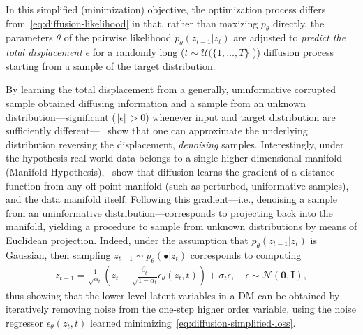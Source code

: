 In this simplified (minimization) objective, the optimization process differs from~\ref{eq:diffusion-likelihood} in that, rather than maxizing \( p_\theta \) directly, the parameters \( \theta \) of the pairwise likelihood \( p_\theta(z_{t-1} \vert z_t) \) are adjusted to \emph{predict the total displacement} \( \epsilon \) for a randomly long (\( t \sim \mathcal{U}(\{1,\dots,T\} \) )) diffusion process starting from a sample of the target distribution.

By learning the total displacement from a generally, uninformative corrupted sample obtained diffusing information and a sample from an unknown distribution---significant (\( \Vert \epsilon \Vert > 0 \)) whenever input and target distribution are sufficiently different---~\citet{hoDenoisingDiffusionProbabilistic2020} show that one can approximate the underlying distribution reversing the displacement, \emph{denoising} samples.
Interestingly, under the hypothesis real-world data belongs to a single higher dimensional manifold (Manifold Hypothesis),~\citet{permenterInterpretingImprovingDiffusion2024} show that diffusion learns the gradient of a distance function from any off-point manifold (such as perturbed, uniformative samples), and the data manifold itself.
Following this gradient---i.e., denoising a sample from an uninformative distribution---corresponds to projecting back into the manifold, yielding a procedure to sample from unknown distributions by means of Euclidean projection.
Indeed, under the assumption that \(p_\theta (z_{t-1} \vert z_t) \) is Gaussian, then sampling \(z_{t-1} \sim p_\theta(\bullet \vert z_{t}) \) corresponds to computing
\begin{align}
    z_{t-1} = \frac{1}{\sqrt{\alpha_t}} \left( z_t - \frac{\beta_t}{\sqrt{1 - \bar\alpha_t}} \epsilon_\theta(z_t, t) \right) + \sigma_t \epsilon, \quad \epsilon \sim \mathcal N(\mathbf{0}, \mathbf{I}), \label{eq:diffusion-denoising-definition}
\end{align}
thus showing that the lower-level latent variables in a DM can be obtained by iteratively removing noise from the one-step higher order variable, using the noise regressor \( \epsilon_\theta(z_t, t)\) learned minimizing~\ref{eq:diffusion-simplified-loss}.

